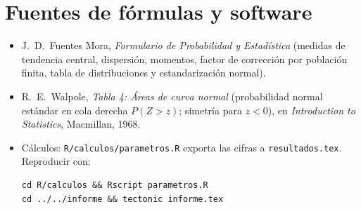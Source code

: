 \documentclass[11pt,a4paper]{article}
\newcommand{\FP}{\text{[F]}}
\newcommand{\TP}{\text{[T]}}
\begin{document}
\section*{Fuentes de fórmulas y software}
\begin{itemize}\itemsep0pt
  \item[\FP] J.~D.~Fuentes Mora, \emph{Formulario de Probabilidad y
        Estadística} (medidas de tendencia central, dispersión, momentos,
        factor de corrección por población finita, tabla de distribuciones y
        estandarización normal).
  \item[\TP] R.~E.~Walpole, \emph{Tabla 4: Áreas de curva normal}
        (probabilidad normal estándar en cola derecha $P(Z>z)$; simetría para
        $z<0$), en \emph{Introduction to Statistics}, Macmillan, 1968.
  \item Cálculos: \texttt{R/calculos/parametros.R} exporta las cifras a
        \texttt{resultados.tex}. Reproducir con:
\begin{verbatim}
cd R/calculos && Rscript parametros.R
cd ../../informe && tectonic informe.tex
\end{verbatim}
\end{itemize}
\end{document}

